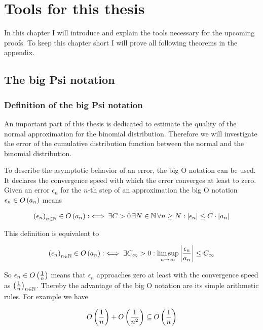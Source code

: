 \chapter{Tools for this thesis} \label{chapter:tools}

In this chapter I will introduce and explain the tools necessary for the upcoming proofs. To keep this chapter short I will prove all following theorems in the appendix.

\section{The big Psi notation}

\subsection{Definition of the big Psi notation}
An important part of this thesis is dedicated to estimate the quality of the normal approximation for the binomial distribution. Therefore we will investigate the error of the cumulative distribution function between the normal and the binomial distribution.

To describe the asymptotic behavior of an error, the big O notation can be used. It declares the convergence speed with which the error converges at least to zero. Given an error $\epsilon_n$ for the $n$-th step of an approximation the big O notation $\epsilon_n \in O\left( {a_n} \right)$ means~\cite[p.~444]{graham}\cite[p.~100]{aigner}

\begin{align} \label{bigo_def1}
  \left({\epsilon_n}\right)_{{n}\in\mathbb N} \in O\left( {a_n} \right) :\iff \exists C > 0\, \exists N\in\mathbb N\,\forall n\ge N: \left|{\epsilon_n}\right| \le C \cdot \left|{a_n}\right|
\end{align}

\noindent This definition is equivalent to~\cite[p.~383]{hachenberger}\cite{wiki:bigo}

\begin{align} \label{bigo_def_limsup}
  \left({\epsilon_n}\right)_{{n}\in\mathbb N} \in O\left( {a_n} \right) :\iff \exists C_\infty > 0: \limsup_{n\to\infty} \left|{\frac{\epsilon_n}{a_n}}\right| \le C_\infty
\end{align}

So $\epsilon_n \in O\left( {\frac 1n} \right)$ means that $\epsilon_n$ approaches zero at least with the convergence speed as $\left({\frac 1n}\right)_{{n}\in\mathbb N}$. Thereby the advantage of the big O notation are its simple arithmetic rules. For example we have

\begin{align}
  O\left( {\frac 1n} \right) + O\left( {\frac 1{n^2}} \right) \subseteq O\left( {\frac 1n} \right)
\end{align}

